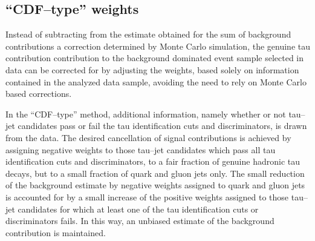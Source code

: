 \subsection{``CDF--type'' weights}
\label{secBgEstFakeRate_frCDFtypeWeights}
%
%
Instead of subtracting from the estimate obtained for the sum of background
contributions a correction determined by Monte Carlo simulation, the genuine tau
contribution contribution to the background dominated event sample selected in
data can be corrected for by adjusting the weights, based solely on information
contained in the analyzed data sample, avoiding the need to rely on Monte
Carlo based corrections.

In the ``CDF--type'' method, additional information, namely whether or not
tau--jet candidates pass or fail the tau identification cuts and discriminators,
is drawn from the data.  The desired cancellation of signal contributions is
achieved by assigning negative weights to those tau--jet candidates which pass
all tau identification cuts and discriminators, \ie to a fair fraction of
genuine hadronic tau decays, but to a small fraction of quark and gluon jets
only.  The small reduction of the background estimate by negative weights
assigned to quark and gluon jets is accounted for by a small increase of the
positive weights assigned to those tau--jet candidates for which at least one of
the tau identification cuts or discriminators fails.  In this way, an unbiased
estimate of the background contribution is maintained.


